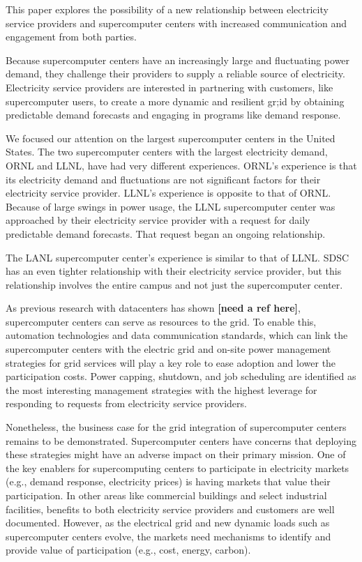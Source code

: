 This paper explores the possibility of a new relationship between electricity service providers
and supercomputer centers with increased communication and engagement from both parties.

Because supercomputer centers have an increasingly large and fluctuating
power demand, they challenge their providers to supply a reliable
source of electricity.
Electricity service providers are interested in partnering with customers,
like supercomputer users, to create a more dynamic and resilient gr;id
by obtaining predictable demand forecasts and engaging in programs like 
demand response.

We focused our attention on the largest supercomputer centers in the United States. The two supercomputer 
centers with the largest electricity demand, ORNL and LLNL, have had very different experiences.  
ORNL's experience is that its electricity demand and fluctuations are not significant factors for their 
electricity service provider.  
LLNL's experience is opposite to that of ORNL.  Because of large swings in 
power usage, the LLNL supercomputer center was approached by their electricity service provider with a 
request for daily predictable demand forecasts. That request began an ongoing relationship.  

The LANL supercomputer center's experience is similar to that of LLNL. SDSC has an even tighter relationship 
with their electricity service provider, but this relationship involves the entire campus and not just the 
supercomputer center.  

As previous research with datacenters has shown \textbf{[need a ref here]}, supercomputer centers can serve as   
resources to the grid. To enable this, automation technologies and data communication standards, 
which can link the supercomputer centers with the electric grid and on-site power management strategies 
for grid services will play a key role to ease adoption and lower the participation costs.  Power capping, 
shutdown, and job scheduling are identified as the most interesting management strategies with the highest 
leverage for responding to requests from electricity service providers.  

Nonetheless, the business case for the grid integration of supercomputer centers remains to be demonstrated.  
Supercomputer centers have concerns that deploying these strategies might have an adverse impact on 
their primary mission. One of the key enablers for supercomputing centers to participate in 
electricity markets (e.g., demand response, electricity prices) is having markets that value their 
participation. In other areas like commercial buildings and select industrial facilities, benefits to 
both electricity service providers and customers are well documented. However, as the electrical grid 
and new dynamic loads such as supercomputer centers evolve, the markets need mechanisms to identify 
and provide value of participation (e.g., cost, energy, carbon).


